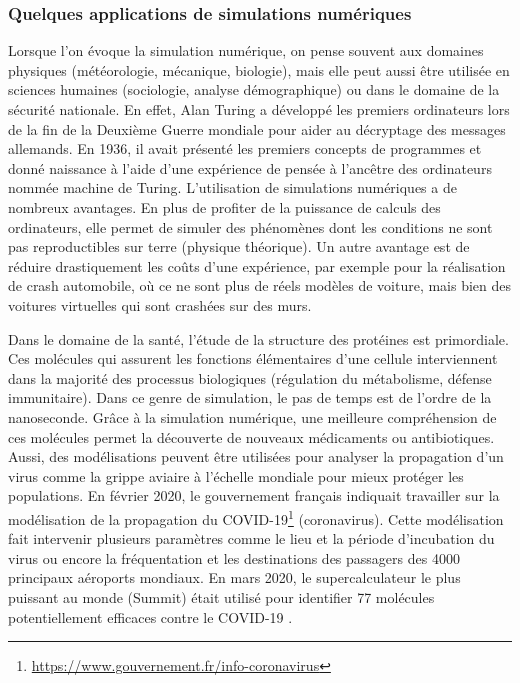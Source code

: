    \subsubsection{Quelques applications de simulations numériques}
        Lorsque l'on évoque la simulation numérique, on pense souvent aux domaines physiques (météorologie, mécanique, biologie), mais elle peut aussi être utilisée en sciences humaines (sociologie, analyse démographique) ou dans le domaine de la sécurité nationale. En effet, Alan Turing a développé les premiers ordinateurs lors de la fin de la Deuxième Guerre mondiale pour aider au décryptage des messages allemands. En 1936, il avait présenté les premiers concepts de programmes et donné naissance à l'aide d'une expérience de pensée à l'ancêtre des ordinateurs nommée machine de Turing.  L'utilisation de simulations numériques a de nombreux avantages. En plus de profiter de la puissance de calculs des ordinateurs, elle permet de simuler des phénomènes dont les conditions ne sont pas reproductibles sur terre (physique théorique). Un autre avantage est de réduire drastiquement les coûts d'une expérience, par exemple pour la réalisation de crash automobile, où ce ne sont plus de réels modèles de voiture, mais bien des voitures virtuelles qui sont crashées sur des murs.
        
        Dans le domaine de la santé, l'étude de la structure des protéines est primordiale.  Ces molécules qui assurent les fonctions élémentaires d'une cellule interviennent dans la majorité des processus biologiques (régulation du métabolisme, défense immunitaire). Dans ce genre de simulation, le pas de temps est de l'ordre de la nanoseconde. Grâce à la simulation numérique, une meilleure compréhension de ces molécules permet la découverte de nouveaux médicaments ou antibiotiques. 
        Aussi, des modélisations peuvent être utilisées pour analyser la propagation d'un virus comme la grippe aviaire à l'échelle mondiale pour mieux protéger les populations\cite{CEA2007}. En février 2020, le gouvernement français indiquait travailler sur la modélisation de la propagation du COVID-19\footnote{\url{https://www.gouvernement.fr/info-coronavirus}} (coronavirus). Cette modélisation fait intervenir plusieurs paramètres comme le lieu et la période d'incubation du virus ou encore la fréquentation et les destinations des passagers des 4000 principaux aéroports mondiaux. En mars 2020, le supercalculateur le plus puissant au monde (Summit) était utilisé pour identifier 77 molécules potentiellement efficaces contre le COVID-19 \cite{Smith2020}.

